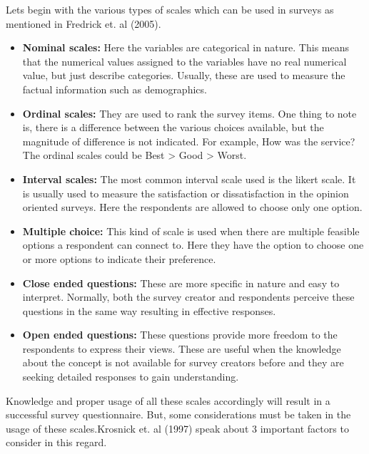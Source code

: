 Lets begin with the various types of scales which can be used in surveys as mentioned in Fredrick et. al (2005).\\
\begin{itemize}


\item \textbf{Nominal scales:} Here the variables are categorical in nature. This means that the numerical values assigned to the variables have no real numerical value, but just describe categories. Usually, these are used to measure the factual information such as demographics.\\

\item \textbf{Ordinal scales:} They are used to rank the survey items. One thing to note is, there is a difference between the various choices available, but the magnitude of difference is not indicated. For example, How was the service? The ordinal scales could be Best > Good > Worst.\\

\item \textbf{Interval scales:} The most common interval scale used is the likert scale. It is usually used to measure the satisfaction or dissatisfaction in the opinion oriented surveys. Here the respondents are allowed to choose only one option.\\

\item \textbf{Multiple choice:} This kind of scale is used when there are multiple feasible options a respondent can connect to. Here they have the option to choose one or more options to indicate their preference.\\

\item \textbf{Close ended questions:} These are more specific in nature and easy to interpret. Normally, both the survey creator and respondents perceive these questions in the same way resulting in effective responses.
\\

\item \textbf{Open ended questions:} These questions provide more freedom to the respondents to express their views. These are useful when the knowledge about the concept is not available for survey creators before and they are seeking detailed responses to gain understanding.
 \\
\end{itemize}

Knowledge and proper usage of all these scales accordingly will result in a successful survey questionnaire. But, some considerations must be taken in the usage of these scales.Krosnick et. al (1997) speak about 3 important factors to consider in this regard.\\

